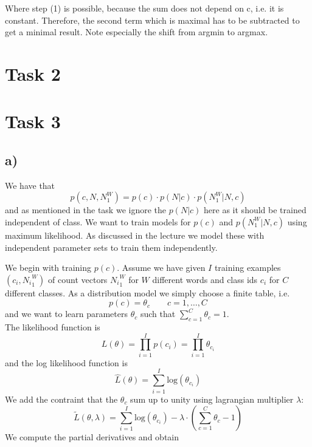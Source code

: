 \documentclass[%
   11pt,              %
   ngerman,           %
   a4paper,           %
   DIV11,             %
]{scrartcl}%
\begin{document}
Where step (1) is possible, because the sum does not depend on c, i.e. it is constant. Therefore, the second term which is maximal has to be subtracted to get a minimal result. Note especially the shift from argmin to argmax.
\
\section*{Task 2}
\section*{Task 3}
\subsection*{a)}
We have that 
\begin{equation*}
	p(c, N, N_1^W) = p(c) \cdot p(N|c) \cdot p(N_1^W|N,c)
\end{equation*}
and as mentioned in the task we ignore the $p(N|c)$ here as it should be trained independent of class. We want to train models for $p(c)$ and $p(N_1^W|N,c)$ using maximum likelihood. As discussed in the lecture we model these with independent parameter sets to train them independently. \par
We begin with training $p(c)$. Assume we have given $I$ training examples $(c_i, {N_i}_1^W)$ of count vectors ${N_i}_1^W$ for $W$ different words and class ids $c_i$ for $C$ different classes. As a distribution model we simply choose a finite table, i.e.
\begin{equation}\label{const}
	p(c) = \theta_c \qquad c = 1,\ldots,C
\end{equation} 
and we want to learn parameters $\theta_c$ such that $\sum_{c=1}^C \theta_c = 1$. \\
The likelihood function is 
\begin{equation*}
	L(\theta) = \prod_{i=1}^I p(c_i) = \prod_{i=1}^I \theta_{c_i}
\end{equation*}
and the log likelihood function is
\begin{equation*}
	\hat{L}(\theta) = \sum_{i=1}^I \text{log}(\theta_{c_i})
\end{equation*}
We add the contraint that the $\theta_c$ sum up to unity using lagrangian multiplier $\lambda$:
\begin{equation*}
	\tilde{L}(\theta, \lambda) = \sum_{i=1}^I \text{log}(\theta_{c_i}) - \lambda \cdot (\sum_{c=1}^C \theta_c - 1)
\end{equation*}
We compute the partial derivatives and obtain
\end{document}
